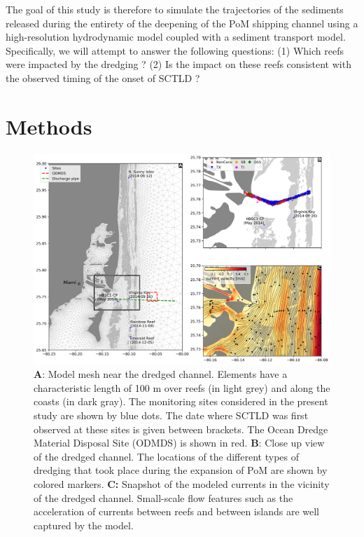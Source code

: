 \documentclass[preprint,12pt,authoryear]{elsarticle}
\begin{document}
The goal of this study is therefore to simulate the trajectories of the sediments released during the entirety of the deepening of the PoM shipping channel using a high-resolution hydrodynamic model coupled with a sediment transport model. Specifically, we will attempt to answer the following questions: (1) Which reefs were impacted by the dredging ? (2) Is the impact on these reefs consistent with the observed timing of the onset of SCTLD ? 

\section{Methods}

\begin{figure}
    \centering
    \includegraphics[width=\textwidth]{figures/fig_mesh_onset.png}
    \caption{\textbf{A}: Model mesh near the dredged channel. Elements have a characteristic length of 100 m over reefs (in light grey) and along the coasts (in dark gray). The monitoring sites considered in the present study are shown by blue dots. The date where SCTLD was first observed at these sites is given between brackets. The Ocean Dredge Material Disposal Site (ODMDS) is shown in red. \textbf{B}: Close up view of the dredged channel. The locations of the different types of dredging that took place during the expansion of PoM are shown by colored markers. \textbf{C:} Snapshot of the modeled currents in the vicinity of the dredged channel. Small-scale flow features such as the acceleration of currents between reefs and between islands are well captured by the model.}
    \label{fig:onset_mesh}
\end{figure}
\end{document}
